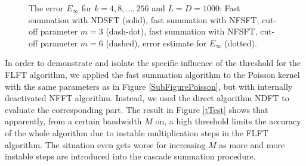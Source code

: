 \begin{figure}[tb]
  \centering
  \hfill
  \caption{The error $E_{\infty}$ for $k = 4,8,\ldots,256$ and $L = D = 1000$: 
  Fast summation with NDSFT (solid), fast summation with NFSFT, 
  cut-off parameter $m = 3$ (dash-dot), fast summation with NFSFT, cut-off 
  parameter $m = 6$ (dashed), error estimate for 
  $E_{\infty}$ (dotted).}
  \label{fig:error2}
\end{figure}

In order to 
demonstrate and isolate the specific influence of the threshold 
for the FLFT algorithm, we applied the fast summation algorithm 
to the Poisson kernel with the same parameters as in Figure 
\ref{SubFigurePoisson}, but with internally deactivated NFFT 
algorithm. Instead, we used the direct algorithm NDFT to 
evaluate the corresponding part. The result in Figure \ref{tTest}
shows that 
apparently, from a certain bandwidth $M$ on, a high threshold 
limits the accuracy of the
whole algorithm due to instable multiplication steps in the
FLFT algorithm. The situation even gets worse for increasing
$M$ as more and more instable steps are introduced into the 
cascade summation procedure.

